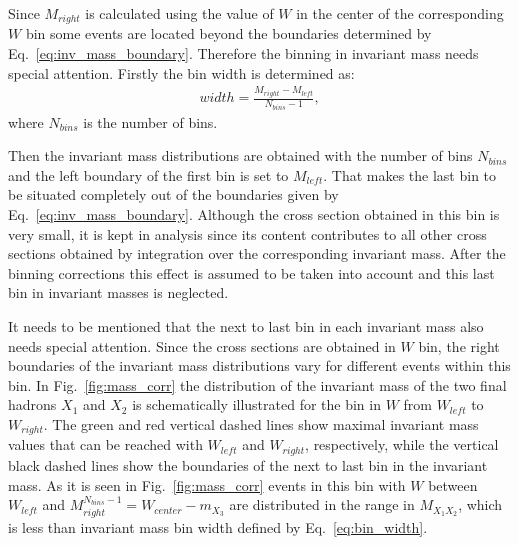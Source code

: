 
Since $M_{right}$  is calculated using the value of $W$ in the center of the corresponding $W$ bin some events are located beyond the boundaries determined by Eq.~\ref{eq:inv_mass_boundary}. Therefore the binning in invariant mass needs special attention.
Firstly the bin width is determined as:
\begin{equation}
\begin{aligned}
width = \frac{M_{right}-M_{left}}{N_{bins}-1}, \label{eq:bin_width}
\end{aligned}  
\end{equation} 
where $N_{bins}$ is the number of bins. 

Then the invariant mass distributions are obtained with the number of bins $N_{bins}$ and the left boundary of the first bin is set to $M_{left}$. That makes the last bin to be situated completely out of the boundaries given by Eq.~\ref{eq:inv_mass_boundary}. Although the cross section obtained in this bin is very small, it is kept in analysis since its content contributes to all other cross sections obtained by integration over the corresponding invariant mass. 
After the binning corrections this effect is assumed to be taken into account and this last bin in invariant masses is neglected. 

It needs to be mentioned that the next to last bin in each invariant mass also needs special attention. Since the cross sections are obtained in $W$ bin, the right boundaries of the invariant mass distributions vary for different events within this bin. In Fig.~\ref{fig:mass_corr} the distribution of the invariant mass of the two final hadrons $X_{1}$ and $X_{2}$ is schematically illustrated for the bin in $W$ from $W_{left}$ to $W_{right}$. 
The green and red vertical dashed lines show  maximal invariant mass values that can be reached with $W_{left}$ and $W_{right}$, respectively, while the vertical black dashed lines show the boundaries of the next to last bin in the invariant mass.
As it is seen in Fig.~\ref{fig:mass_corr} events in this bin with $W$ between $W_{left}$ and $M_{right}^{N_{bins}-1} = W_{center} - m_{X_{3}}$ are distributed in the range in $M_{X_{1}X_{2}}$, which is less than invariant mass bin width defined by Eq.~\ref{eq:bin_width}.

